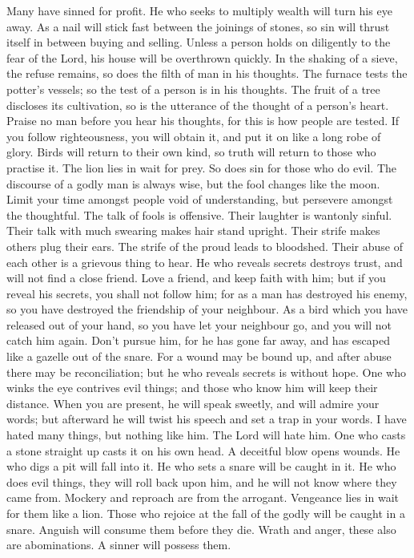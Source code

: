  Many have sinned for profit. He who seeks to multiply
wealth will turn his eye away.  As a nail will stick fast
between the joinings of stones, so sin will thrust itself in between
buying and selling.  Unless a person holds on diligently to
the fear of the Lord, his house will be overthrown quickly. 
In the shaking of a sieve, the refuse remains, so does the filth of man
in his thoughts.  The furnace tests the potter's vessels; so
the test of a person is in his thoughts.  The fruit of a
tree discloses its cultivation, so is the utterance of the thought of a
person's heart.  Praise no man before you hear his thoughts,
for this is how people are tested.  If you follow
righteousness, you will obtain it, and put it on like a long robe of
glory.  Birds will return to their own kind, so truth will
return to those who practise it.  The lion lies in wait for
prey. So does sin for those who do evil.  The discourse of
a godly man is always wise, but the fool changes like the moon.
 Limit your time amongst people void of understanding, but
persevere amongst the thoughtful.  The talk of fools is
offensive. Their laughter is wantonly sinful.  Their talk
with much swearing makes hair stand upright. Their strife makes others
plug their ears.  The strife of the proud leads to
bloodshed. Their abuse of each other is a grievous thing to hear.
 He who reveals secrets destroys trust, and will not find a
close friend.  Love a friend, and keep faith with him; but
if you reveal his secrets, you shall not follow him;  for
as a man has destroyed his enemy, so you have destroyed the friendship
of your neighbour.  As a bird which you have released out
of your hand, so you have let your neighbour go, and you will not catch
him again.  Don't pursue him, for he has gone far away, and
has escaped like a gazelle out of the snare.  For a wound
may be bound up, and after abuse there may be reconciliation; but he who
reveals secrets is without hope.  One who winks the eye
contrives evil things; and those who know him will keep their distance.
 When you are present, he will speak sweetly, and will
admire your words; but afterward he will twist his speech and set a trap
in your words.  I have hated many things, but nothing like
him. The Lord will hate him.  One who casts a stone
straight up casts it on his own head. A deceitful blow opens wounds.
 He who digs a pit will fall into it. He who sets a snare
will be caught in it.  He who does evil things, they will
roll back upon him, and he will not know where they came from.
 Mockery and reproach are from the arrogant. Vengeance lies
in wait for them like a lion.  Those who rejoice at the
fall of the godly will be caught in a snare. Anguish will consume them
before they die.  Wrath and anger, these also are
abominations. A sinner will possess them.

